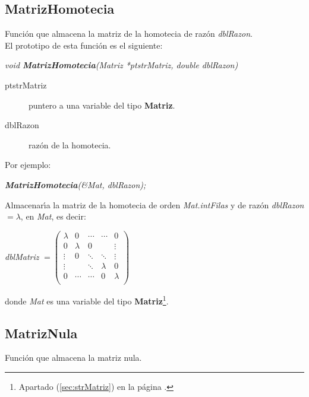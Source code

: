 \newpage

\subsection{MatrizHomotecia}
Funci\'on que almacena la matriz de la homotecia de raz\'on \emph{dblRazon}.\\

El prototipo de esta funci\'on es el siguiente:

\begin{center}
\emph{void \textbf{MatrizHomotecia}(Matriz *ptstrMatriz, double dblRazon)}
\end{center}

\begin{description}
\item[ptstrMatriz] puntero a una variable del tipo \textbf{Matriz}.
\item[dblRazon] raz\'on de la homotecia.
\end{description}

Por ejemplo:

\begin{center}
\emph{\textbf{MatrizHomotecia}(\&Mat, dblRazon);}
\end{center}

Almacenar\'{\i}a la matriz de la homotecia de orden \emph{Mat.intFilas} y de 
raz\'on \emph{dblRazon} $= \lambda$, en \emph{Mat}, es decir:

\begin{center}
\emph{dblMatriz}
$
= \left( \begin{array}{ccccc}
\lambda & 0 & \cdots & \cdots & 0 \\
0 & \lambda & 0 & & \vdots \\
\vdots & 0 & \ddots & \ddots & \vdots \\
\vdots & & \ddots & \lambda & 0 \\
0 & \cdots & \cdots & 0 & \lambda \\
\end{array} \right)
$
\end{center}

donde \emph{Mat} es una variable del tipo \textbf{Matriz}\footnote{Apartado
(\ref{sec:strMatriz}) en la p\'agina \pageref{sec:strMatriz}.}.

\subsection{MatrizNula}
Funci\'on que almacena la matriz nula.\newline

